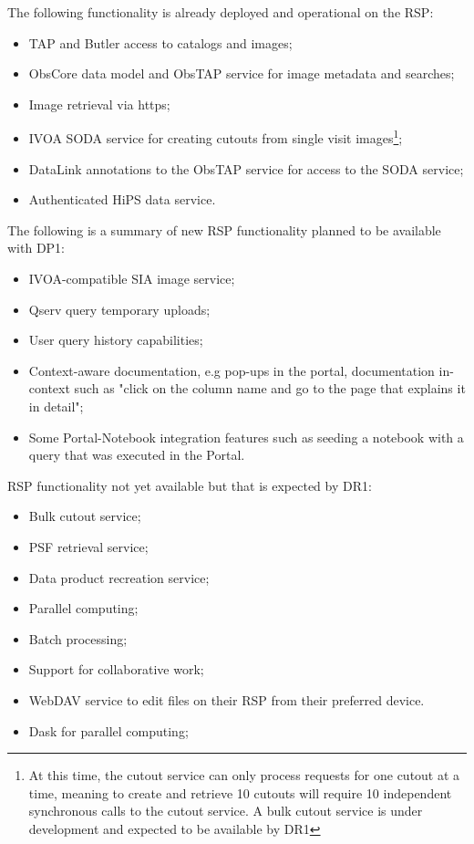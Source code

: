 The following functionality is already deployed and operational on the RSP:
\begin{itemize}
\item TAP and Butler access to catalogs and images;
\item ObsCore data model and ObsTAP service for image metadata and searches;
\item Image retrieval via https;
\item IVOA SODA service for creating cutouts from single visit images\footnote{At this time, the cutout service can only process requests for one cutout at a time, meaning to create and retrieve 10 cutouts will require 10 independent synchronous calls to the cutout service. A bulk cutout service is under development and expected to be available by DR1};
\item DataLink annotations to the ObsTAP service for access to the SODA service;
\item Authenticated HiPS data service.
\end{itemize}

The following is a summary of new RSP functionality planned to be available with  DP1: 
\begin{itemize}
\item IVOA-compatible SIA image service;
\item Qserv query temporary uploads;
\item User query history capabilities;
\item Context-aware documentation, e.g pop-ups in the portal, documentation in-context such as  "click on the column name and go to the page that explains it in detail";
\item Some Portal-Notebook integration features such as  seeding a notebook with a query that was executed in the Portal. 
\end{itemize}

RSP functionality not yet available but that is expected by DR1:
\begin{itemize}
\item Bulk cutout service;
\item PSF retrieval service;
\item Data product recreation service; 
\item Parallel computing;
\item Batch processing; 
\item Support for collaborative work;
\item WebDAV service to edit files on their RSP from their preferred device. 
\item Dask for parallel computing;
\end{itemize} 



